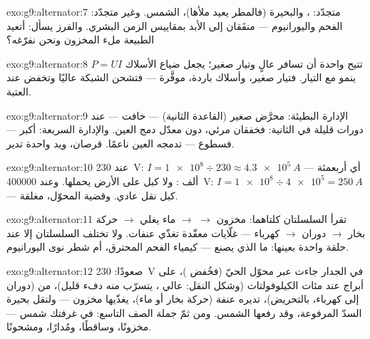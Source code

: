 \begin{solution}{exo:g9:alternator:7}
متجدّد: ، والبحيرة (فالمطر يعيد ملأها)،  الشمس. وغير
متجدّد: الفحم واليورانيوم --- منفَقان إلى الأبد بمقاييس الزمن
البشري. والفرز يسأل: أتعيد الطبيعة ملء المخزون ونحن نفرّغه؟
\end{solution}

\begin{solution}{exo:g9:alternator:8}
$P = U I$ تتيح  واحدة أن تسافر  عالٍ وتيار صغير؛
 يجعل ضياع الأسلاك ينمو مع التيار. فتيار صغير،
وأسلاك باردة،  موفَّرة --- فتشحن الشبكة عاليًا وتخفض عند
العتبة.
\end{solution}

\begin{solution}{exo:g9:alternator:9}
الإدارة البطيئة:  محرَّض صغير (القاعدة الثانية) ---
 خافت --- عند دورات قليلة في الثانية: فخفقان مرئي، دون
معدّل دمج العين. والإدارة السريعة:  أكبر --- فسطوع ---
 تدمجه العين ناعمًا. قرصان، ويد واحدة تدير.
\end{solution}

\begin{solution}{exo:g9:alternator:10}
عند \qty{230}{V}: $I = \num{1e8} \div 230 \approx
\qty{4.3e5}{A}$ --- أي أربعمئة ألف : ولا كبل على الأرض
يحملها. وعند \qty{400000}{V}: $I = \num{1e8} \div \num{4e5} =
\qty{250}{A}$ --- كبل نقل عادي. وقضية المحوّل، مغلقة.
\end{solution}

\begin{solution}{exo:g9:alternator:11}
تقرأ السلسلتان كلتاهما: مخزون $\to$  $\to$ ماء يغلي
$\to$ حركة بخار $\to$ دوران $\to$ كهرباء --- غلّايات معقّدة
تغذّي عنفات. ولا تختلف السلسلتان إلا عند حلقة واحدة بعينها:
ما الذي يصنع  --- كيمياء الفحم المحترق، أم شطر نوى
اليورانيوم.
\end{solution}

\begin{solution}{exo:g9:alternator:12}
صعودًا: \qty{230}{V} في الجدار جاءت عبر محوّل الحيّ (فخُفض
)، على أبراج عند مئات الكيلوفولتات (وشكل النقل:  عالي ، يتسرّب منه دفء قليل)، من 
(دوران إلى كهرباء، بالتحريض)، تديره عنفة (حركة بخار أو ماء)،
يغذّيها مخزون --- ولنقل بحيرة السدّ المرفوعة، وقد رفعها 
الشمس. ومن ثمّ جملة الصف التاسع:  في غرفتك  شمس ---
مخزونًا، وساقطًا، ومُدارًا، ومشحونًا.
\end{solution}

